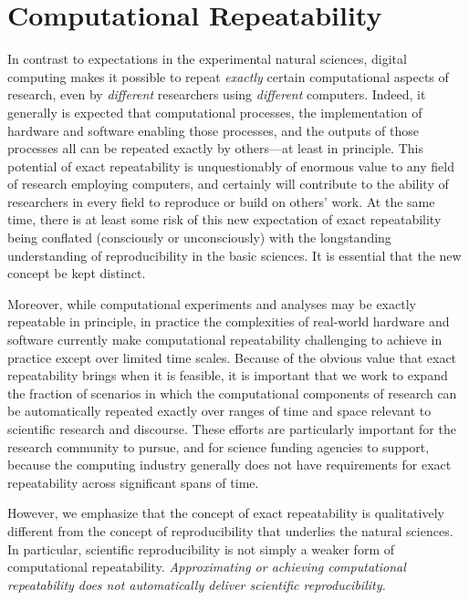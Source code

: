 \section{Computational Repeatability}\label{sec-repeatability}

In contrast to expectations in the experimental natural sciences, digital computing makes it
	possible to repeat \emph{exactly} certain computational aspects of research, even by \emph{different}
	researchers using \emph{different} computers.
Indeed, it generally is expected that computational processes, the implementation of hardware and software
	enabling those processes, and the outputs of those processes all can be repeated exactly by others---at least in principle.
This potential of exact repeatability is unquestionably of enormous value to any field of research employing computers,
	and certainly will contribute to the ability of researchers in every field to reproduce or build on others' work.
At the same time, there is at least some risk of this new expectation of exact repeatability being conflated
	(consciously or unconsciously) with the longstanding understanding of reproducibility in the basic sciences.
It is essential that the new concept be kept distinct.

Moreover, while computational experiments and analyses may be exactly repeatable in principle,
	in practice the complexities of real-world hardware and software currently make computational repeatability
	challenging to achieve in practice except over limited time scales.
Because of the obvious value that exact repeatability brings when it is feasible, it is important that we work to
	expand the fraction of scenarios in which the computational components of research can be automatically
	repeated exactly over ranges of time and space relevant to scientific research and discourse.
These efforts are particularly important for the research community to pursue, and for science funding
	agencies to support, because the computing industry generally does not have requirements for exact
	repeatability across significant spans of time.

However, we emphasize that the concept of exact repeatability is
	qualitatively different from the concept of reproducibility that underlies the natural sciences.
In particular, scientific reproducibility is not simply a weaker form of computational repeatability.
\emph{Approximating or achieving computational repeatability does not automatically deliver scientific reproducibility.}

